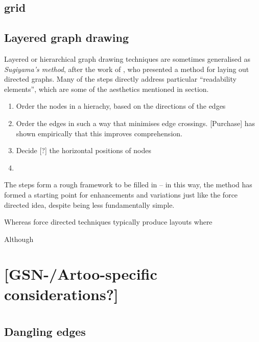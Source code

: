 \subsection{grid}




\subsection{Layered graph drawing}

Layered or hierarchical graph drawing techniques are sometimes generalised as \emph{Sugiyama's method}, after the work of \citet{4308636}, who presented a method for laying out directed graphs. Many of the steps directly address particular ``readability elements'', which are some of the aesthetics mentioned in section.

\begin{enumerate}
\item Order the nodes in a hierachy, based on the directions of the edges
\item Order the edges in such a way that minimises edge crossings. [Purchase] has shown empirically that this improves comprehension.
\item Decide [?] the horizontal positions of nodes
\item
\end{enumerate}

The steps form a rough framework to be filled in -- in this way, the method has formed a starting point for enhancements and variations just like the force directed idea, despite being less fundamentally simple.

Whereas force directed techniques typically produce layouts where 


Although 



\section{[GSN-/Artoo-specific considerations?]}


\section{}



\subsection{Dangling edges}

